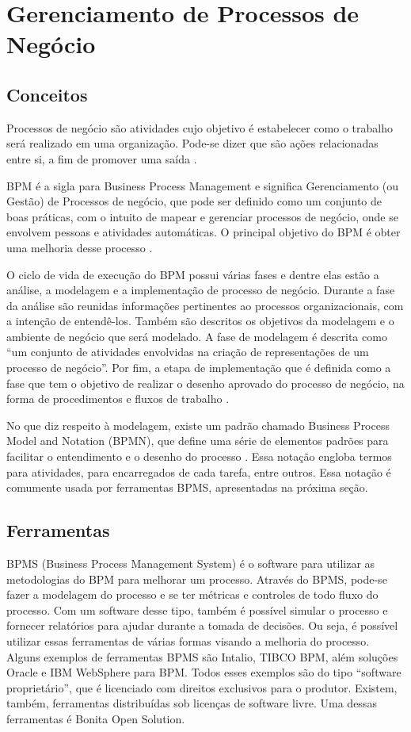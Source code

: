 \documentclass[12pt]{article}
\begin{document}
\section{Gerenciamento de Processos de Negócio}

\subsection{Conceitos}

Processos de negócio são atividades cujo objetivo é estabelecer como o trabalho será realizado em uma organização. Pode-se dizer que são ações relacionadas entre si, a fim de promover uma saída \cite{ABPMP}.

	 BPM é a sigla para Business Process Management e significa Gerenciamento (ou Gestão) de Processos de negócio, que pode ser definido como um conjunto de boas práticas, com o intuito de mapear e gerenciar processos de negócio, onde se envolvem pessoas e atividades automáticas. O principal objetivo do BPM é obter uma melhoria desse processo \cite{weske}.

	O ciclo de vida de execução do BPM possui várias fases e dentre elas estão a análise, a modelagem e a implementação de processo de negócio. Durante a fase da análise são reunidas informações pertinentes ao processos organizacionais, com a intenção de entendê-los. Também são descritos os objetivos da modelagem e o ambiente de negócio que será modelado. A fase de modelagem é descrita como “um conjunto de atividades envolvidas na criação de representações de um processo de negócio”. Por fim, a etapa de implementação que é definida como a fase que tem o objetivo de realizar o desenho aprovado do processo de negócio, na forma de procedimentos e fluxos de trabalho \cite{ABPMP}.

	No que diz respeito à modelagem, existe um padrão chamado Business Process Model and Notation (BPMN), que define  uma série de elementos padrões para facilitar o entendimento e o desenho do processo \cite{BPMN}. Essa notação engloba termos para atividades, para encarregados de cada tarefa, entre outros. Essa notação é comumente usada por ferramentas BPMS, apresentadas na próxima seção.

\subsection{Ferramentas}

BPMS (Business Process Management System) é o software para utilizar as metodologias do BPM para melhorar um processo. Através do BPMS, pode-se fazer a modelagem do processo e se ter métricas e controles de todo fluxo do processo. Com um software desse tipo, também é possível simular o processo e fornecer relatórios para ajudar durante a tomada de decisões. Ou seja, é possível utilizar essas ferramentas de várias formas visando a melhoria do processo. Alguns exemplos de ferramentas BPMS são Intalio, TIBCO BPM, além soluções Oracle e IBM WebSphere para BPM. Todos esses exemplos são do tipo “software proprietário”, que é licenciado com direitos exclusivos para o produtor. Existem, também, ferramentas distribuídas sob licenças de software livre. Uma dessas ferramentas é Bonita Open Solution.
\end{document}
